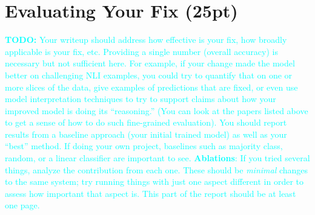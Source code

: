 \documentclass[twocolumn]{article}
\newcommand{\todo}[1]{\textcolor{cyan}{\textbf{TODO:} #1}}
\begin{document}

\section{Evaluating Your Fix (25pt)}


\todo{
Your writeup should address how effective is your fix, how broadly applicable
is your fix, etc. Providing a single number (overall accuracy) is necessary but
not sufficient here. For example, if your change made the model better on
challenging NLI examples, you could try to quantify that on one or more slices
of the data, give examples of predictions that are fixed, or even use model
interpretation techniques to try to support claims about how your improved
model is doing its ``reasoning.'' (You can look at the papers listed above to
get a sense of how to do such fine-grained evaluation).  You should report
results from a baseline approach (your initial trained model) as well as your
``best'' method. If doing your own project, baselines such as majority class,
random, or a linear classifier are important to see. \textbf{Ablations}: If you
tried several things, analyze the contribution from each one. These should be
\emph{minimal} changes to the same system; try running things with just one
aspect different in order to assess how important that aspect is. This part of
the report should be at least one page.}


\end{document}
